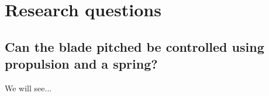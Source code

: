 \chapter{Research questions}
\section{Can the blade pitched be controlled using propulsion and a spring?}
We will see...